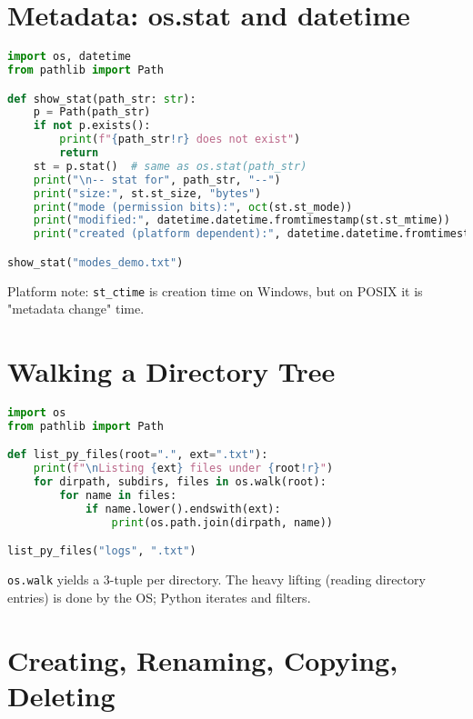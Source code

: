 \section{Metadata: os.stat and datetime}

\begin{lstlisting}[language=Python, caption={Inspect file metadata and pretty-print timestamps.}]
import os, datetime
from pathlib import Path

def show_stat(path_str: str):
    p = Path(path_str)
    if not p.exists():
        print(f"{path_str!r} does not exist")
        return
    st = p.stat()  # same as os.stat(path_str)
    print("\n-- stat for", path_str, "--")
    print("size:", st.st_size, "bytes")
    print("mode (permission bits):", oct(st.st_mode))
    print("modified:", datetime.datetime.fromtimestamp(st.st_mtime))
    print("created (platform dependent):", datetime.datetime.fromtimestamp(st.st_ctime))

show_stat("modes_demo.txt")
\end{lstlisting}

\noindent
Platform note: \texttt{st\_ctime} is creation time on Windows, but on POSIX it is "metadata change" time.

\section{Walking a Directory Tree}

\begin{lstlisting}[language=Python, caption={Walk with os.walk and filter by extension.}]
import os
from pathlib import Path

def list_py_files(root=".", ext=".txt"):
    print(f"\nListing {ext} files under {root!r}")
    for dirpath, subdirs, files in os.walk(root):
        for name in files:
            if name.lower().endswith(ext):
                print(os.path.join(dirpath, name))

list_py_files("logs", ".txt")
\end{lstlisting}

\noindent
\texttt{os.walk} yields a 3-tuple per directory. The heavy lifting (reading directory entries) is done by the OS; Python iterates and filters.

\section{Creating, Renaming, Copying, Deleting}


